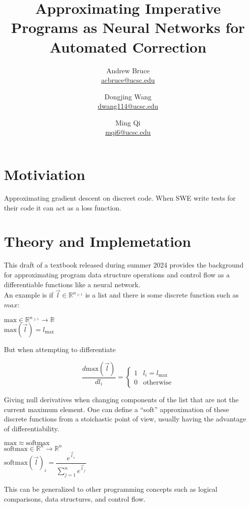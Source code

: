 \documentclass{article}
\title{Approximating Imperative Programs as Neural Networks for Automated Correction}
\author{Andrew Bruce \\ \href{mailto:acbruce@ucsc.edu}{acbruce@ucsc.edu}
  \and Dongjing Wang \\ \href{mailto:dwang114@ucsc.edu}{dwang114@ucsc.edu}
  \and Ming Qi \\ \href{mailto:mqi6@ucsc.edu}{mqi6@ucsc.edu} }
\begin{document}
\maketitle
\section*{Motiviation}
Approximating gradient descent on discreet code. When SWE write tests for their code it can act as a loss function.
\section*{Theory and Implemetation}
This draft of a textbook \cite{blondel2024elementsdifferentiableprogramming} released during summer 2024 provides the background for approximating program data structure operations and control flow as a differentiable functions like a neural network.\\
An example is if $\vec{l} \in \mathbb{R}^{n_{\ge 1}}$ is a list and there is some discrete function such as $max$:
\begin{center}
  $\mathrm{max} \in \mathbb{R}^{n_{\ge 1}} \rightarrow \mathbb{R}$\\
  $\mathrm{max}(\vec{l}) = l_{\mathrm{max}}$
\end{center}
But when attempting to differentiate
\begin{center}
  $$\dfrac{d \mathrm{max}(\vec{l})}{dl_i} = \left\{
  \begin{array}{ll}
    1 & l_i = l_{\mathrm{max}} \\
    0 & \mathrm{otherwise}
  \end{array} 
  \right.$$
\end{center}
Giving null derivatives when changing components of the list that are not the current maximum element.
One can define a ``soft'' approximation of these discrete functions from a stoichastic point of view, usually having the advantage of differentiability.
\begin{center}
  $\mathrm{max} \approx \mathrm{softmax}$\\
  $\mathrm{softmax} \in \mathbb{R}^n \rightarrow \mathbb{R}^n$\\
  $\mathrm{softmax}(\vec{l})_i = \dfrac{e^{\vec{l}_i}}{\sum_{j=1}^n e^{\vec{l}_j}}$\\
\end{center}
This can be generalized to other programming concepts such as logical comparisons, data structures, and control flow.
\end{document}

